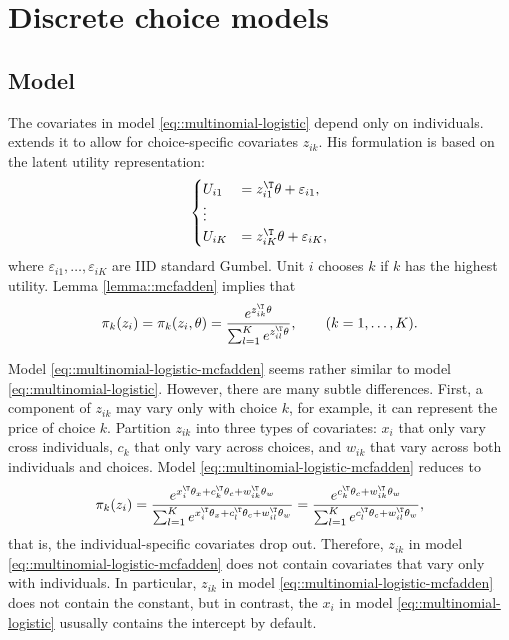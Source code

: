 \section{Discrete choice models}\label{sec::discretechioce}


\subsection{Model}
The covariates in model \eqref{eq::multinomial-logistic} depend only on individuals. 
\citet{mcfadden1974conditional} extends it to allow for choice-specific covariates $z_{ik}$. His formulation is based on the latent utility representation: 
\[
\begin{cases}
U_{i1} & =   z_{i1}^{\T} \theta +\varepsilon_{i1},\\
\vdots\\
U_{iK} & =z_{iK}^{\T} \theta +\varepsilon_{iK},
\end{cases}
\]
where $\varepsilon_{i1},\ldots,\varepsilon_{iK}$ are IID standard Gumbel. Unit $i$ chooses $k$ if $k$ has the highest utility. Lemma \ref{lemma::mcfadden} implies that
\begin{eqnarray}
\pi_{k}(z_{i})=\pi_{k}(z_{i},\theta)=\frac{e^{  z_{ik}^{\T}\theta }  }{\sum_{ l =1}^{K}e^{ z_{i l }^{\T}\theta } } ,\qquad(k=1,\ldots,K) .
\label{eq::multinomial-logistic-mcfadden}
\end{eqnarray}


Model \eqref{eq::multinomial-logistic-mcfadden} seems rather similar to model \eqref{eq::multinomial-logistic}. However, there are many subtle differences. First, a component of $z_{ik}$ may vary only with choice $k$, for example, it can represent the price of choice $k$. Partition $z_{ik}$ into three types of covariates: $x_i$ that only vary cross individuals, $c_k$ that only vary across choices, and $w_{ik}$ that vary across both individuals and choices. Model \eqref{eq::multinomial-logistic-mcfadden} reduces to
$$
\pi_{k}(z_{i})  =\frac{e^{  x_{i}^{\T}\theta_x + c_k^{\T}\theta_c + w_{ik}^{\T} \theta_w }  }
{\sum_{ l =1}^{K}e^{ x_{i}^{\T}\theta_x + c_{ l }^{\T}\theta_c + w_{i l }^{\T} \theta_w }  }  
=\frac{e^{   c_k^{\T}\theta_c + w_{ik}^{\T} \theta_w }  }
{\sum_{ l =1}^{K}e^{   c_{ l }^{\T}\theta_c + w_{i l }^{\T} \theta_w } }  ,
$$
that is, the individual-specific covariates drop out. Therefore, $z_{ik}$ in model \eqref{eq::multinomial-logistic-mcfadden} does not contain covariates that vary only with individuals. In particular, $z_{ik}$ in model \eqref{eq::multinomial-logistic-mcfadden} does not contain the constant, but in contrast, the $x_i$ in model \eqref{eq::multinomial-logistic} ususally contains the intercept by default. 


